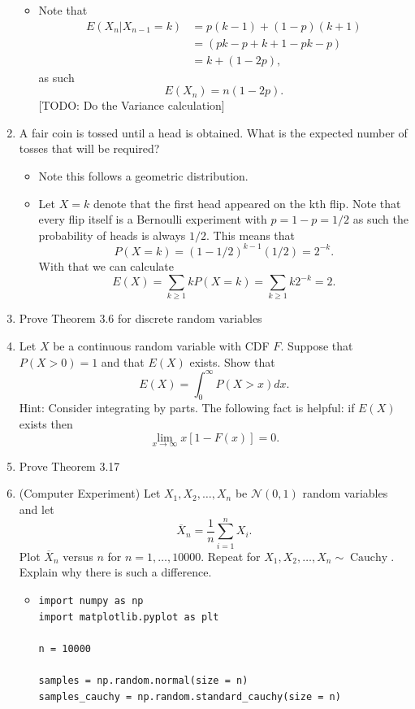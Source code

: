 \documentclass{article}
\begin{document}
\begin{enumerate}
		\begin{itemize}
			\item Note that
			$$
			\begin{aligned}
			E(X_n|X_{n - 1} = k) &= p(k - 1) + (1 - p)(k + 1) \\
			&= (pk - p + k + 1 - pk - p) \\
			&= k + (1 - 2p),
			\end{aligned}
			$$
			as such
			$$
			E(X_n) = n(1 - 2p).
			$$
			[TODO: Do the Variance calculation]
		\end{itemize}
	\item A fair coin is tossed until a head is obtained. What is the expected number of tosses that will be required?
		\begin{itemize}
			\item Note this follows a geometric distribution.
			\item Let $X = k$ denote that the first head appeared on the kth flip. Note that every flip itself is a Bernoulli experiment with $p = 1 - p = 1/2$ as such the probability of heads is always $1/2$. This means that
			$$
			P(X = k) = (1 - 1/2)^{k - 1}(1 / 2) = 2^{-k}.
			$$
			With that we can calculate
			$$
			E(X) = \sum_{k \geq 1} k P(X = k) = \sum_{k \geq 1} k 2^{-k} = 2.
			$$
		\end{itemize}
	\item Prove Theorem 3.6 for discrete random variables
	\item Let $X$ be a continuous random variable with CDF $F$. Suppose that $P(X > 0) = 1$ and that $E(X)$ exists. Show that
	$$
	E(X) = \int_0^\infty P(X > x) dx.
	$$
	Hint: Consider integrating by parts. The following fact is helpful: if $E(X)$ exists then
	$$
	\lim_{x \rightarrow \infty} x [1 - F(x)] = 0.
	$$
	\item Prove Theorem 3.17
	\item (Computer Experiment) Let $X_1, X_2, \dots, X_n$ be $\mathcal{N}(0, 1)$ random variables and let
	$$
	\overline{X}_n = \frac{1}{n} \sum_{i = 1}^n X_i.
	$$
	Plot $\overline{X}_n$ versus $n$ for $n = 1, \dots, 10000$. Repeat for $X_1, X_2, \dots, X_n \sim \operatorname{Cauchy}$. Explain why there is such a difference.
		\begin{itemize}
			\item
			\begin{verbatim}
import numpy as np
import matplotlib.pyplot as plt

n = 10000

samples = np.random.normal(size = n)
samples_cauchy = np.random.standard_cauchy(size = n)


\end{verbatim}
\end{itemize}
\end{enumerate}
\end{document}
